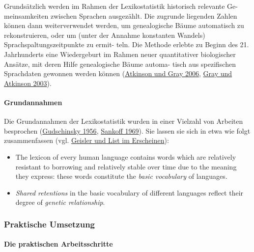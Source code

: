 Grundsätzlich werden im Rahmen der Lexikostatistik historisch relevante
Ge- meinsamkeiten zwischen Sprachen ausgezählt. Die zugrunde liegenden
Zahlen können dann weiterverwendet werden, um genealogische Bäume
automatisch zu rekonstruieren, oder um (unter der Annahme konstanten
Wandels) Sprachspaltungszeitpunkte zu ermit- teln. Die Methode erlebte
zu Beginn des 21. Jahrhunderts eine Wiedergeburt im Rahmen neuer
quantitativer biologischer Ansätze, mit deren Hilfe genealogische Bäume
automa- tisch aus spezifischen Sprachdaten gewonnen werden können
(\href{http://bibliography.lingpy.org?key=Atkinson2006}{Atkinson und
Gray 2006}, \href{http://bibliography.lingpy.org?key=Gray2003}{Gray und
Atkinson 2003}).



\paragraph{Grundannahmen}

Die Grundannahmen der Lexikostatistik wurden in einer Vielzahl von
Arbeiten besprochen
(\href{http://bibliography.lingpy.org?key=Gudschinsky1956}{Gudschinsky
1956}, \href{http://bibliography.lingpy.org?key=Sankoff1969}{Sankoff
1969}). Sie lassen sie sich in etwa wie folgt zusammenfassen (vgl.
\href{http://lingulist.de/jump.php?paper=Geisler2014\&href=documents/beautiful_trees.pdf}{Geisler
und List im Erscheinen}):

\begin{itemize}
\item
  The lexicon of every human language contains words which are
  relatively resistant to borrowing and relatively stable over time due
  to the meaning they express: these words constitute the \emph{basic
  vocabulary} of languages.
\item
  \emph{Shared retentions} in the basic vocabulary of different
  languages reflect their degree of \emph{genetic relationship}.
\end{itemize}



\subsubsection{\texorpdfstring{{Praktische
Umsetzung}}{Praktische Umsetzung}}

\paragraph{Die praktischen Arbeitsschritte}

